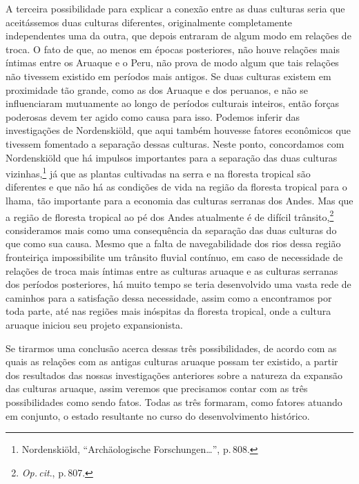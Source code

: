 A terceira possibilidade para explicar a conexão entre as duas culturas
seria que aceitássemos duas culturas diferentes, originalmente
completamente independentes uma da outra, que depois entraram de algum
modo em relações de troca. O fato de que, ao menos em épocas
posteriores, não houve relações mais íntimas entre os Aruaque e o Peru,
não prova de modo algum que tais relações não tivessem existido em
períodos mais antigos. Se duas culturas existem em proximidade tão
grande, como as dos Aruaque e dos peruanos, e não se influenciaram
mutuamente ao longo de períodos culturais inteiros, então forças
poderosas devem ter agido como causa para isso. Podemos inferir das
investigações de Nordenskiöld, que aqui também houvesse fatores
econômicos que tivessem fomentado a separação dessas culturas. Neste
ponto, concordamos com Nordenskiöld que há impulsos importantes para a
separação das duas culturas vizinhas,\footnote{Nordenskiöld,
  ``Archäologische Forschungen\ldots'', p.\,808.} 
  já que as plantas cultivadas na serra e na floresta tropical
são diferentes e que não há as condições de vida na região da floresta
tropical para o lhama, tão importante para a economia das culturas
serranas dos Andes. Mas que a região de floresta tropical ao pé dos
Andes atualmente é de difícil trânsito,\footnote{\textit{Op.\,cit}., p.\,807.}
consideramos mais como uma consequência da separação das duas culturas
do que como sua causa. Mesmo que a falta de navegabilidade dos rios
dessa região fronteiriça impossibilite um trânsito fluvial contínuo, em
caso de necessidade de relações de troca mais íntimas entre as culturas
aruaque e as culturas serranas dos períodos posteriores, há muito tempo
se teria desenvolvido uma vasta rede de caminhos para a satisfação dessa
necessidade, assim como a encontramos por toda parte, até nas regiões
mais inóspitas da floresta tropical, onde a cultura aruaque iniciou seu
projeto expansionista.

Se tirarmos uma conclusão acerca dessas três possibilidades, de acordo
com as quais as relações com as antigas culturas aruaque possam ter
existido, a partir dos resultados das nossas investigações anteriores
sobre a natureza da expansão das culturas aruaque, assim veremos que
precisamos contar com as três possibilidades como sendo fatos. Todas as
três formaram, como fatores atuando em conjunto, o estado resultante no
curso do desenvolvimento histórico.

